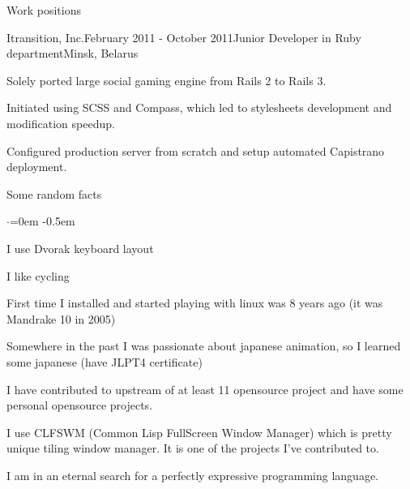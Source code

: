 \documentclass{resume} %
\begin{document}
\begin{rSection}{Work positions}
\begin{rSubsection}{Itransition, Inc.}{February 2011 - October 2011}{Junior Developer in Ruby department}{Minsk, Belarus}
\item Solely ported large social gaming engine from Rails 2 to Rails 3.
\item Initiated using SCSS and Compass, which led to stylesheets development and modification speedup.
\item Configured production server from scratch and setup automated Capistrano deployment.
\end{rSubsection}

\end{rSection}


\begin{rSection}{Some random facts}
  \smallskip
  \begin{list}{$\cdot$}{\leftmargin=0em} %
    \itemsep -0.5em \vspace{-0.5em} %
  \item I use Dvorak keyboard layout
  \item I like cycling
  \item First time I installed and started playing with linux was 8 years ago (it was
    Mandrake 10 in 2005)
  \item Somewhere in the past I was passionate about japanese animation, so I learned
    some japanese (have JLPT4 certificate)
  \item I have contributed to upstream of at least 11 opensource project
      and have some personal opensource projects.
  \item I use CLFSWM (Common Lisp FullScreen Window Manager) which is pretty unique tiling
      window manager. It is one of the projects I've contributed to.
  \item I am in an eternal search for a perfectly expressive programming language.
  \end{list}
\end{rSection}

\end{document}
